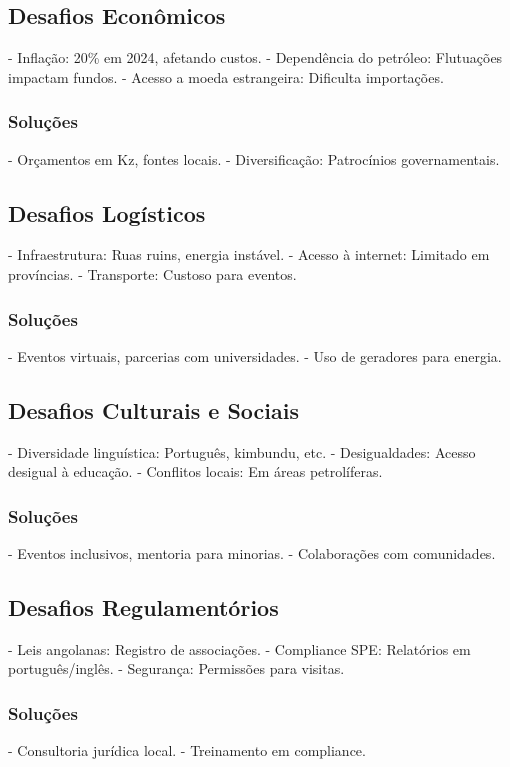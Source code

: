 \documentclass[12pt]{article}
\begin{document}
\subsection{Desafios Econômicos}
- Inflação: 20\% em 2024, afetando custos.
- Dependência do petróleo: Flutuações impactam fundos.
- Acesso a moeda estrangeira: Dificulta importações.

\subsubsection{Soluções}
- Orçamentos em Kz, fontes locais.
- Diversificação: Patrocínios governamentais.

\subsection{Desafios Logísticos}
- Infraestrutura: Ruas ruins, energia instável.
- Acesso à internet: Limitado em províncias.
- Transporte: Custoso para eventos.

\subsubsection{Soluções}
- Eventos virtuais, parcerias com universidades.
- Uso de geradores para energia.

\subsection{Desafios Culturais e Sociais}
- Diversidade linguística: Português, kimbundu, etc.
- Desigualdades: Acesso desigual à educação.
- Conflitos locais: Em áreas petrolíferas.

\subsubsection{Soluções}
- Eventos inclusivos, mentoria para minorias.
- Colaborações com comunidades.

\subsection{Desafios Regulamentórios}
- Leis angolanas: Registro de associações.
- Compliance SPE: Relatórios em português/inglês.
- Segurança: Permissões para visitas.

\subsubsection{Soluções}
- Consultoria jurídica local.
- Treinamento em compliance.
\end{document}
